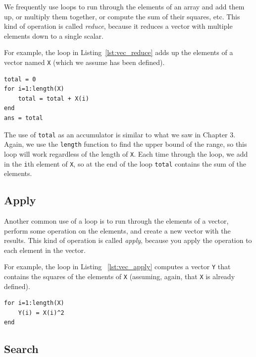 We frequently use loops to run through the elements of an array
and add them up, or multiply them together, or compute the sum
of their squares, etc.  This kind of operation is called \emph{reduce},
because it reduces a vector with multiple elements down to a single
scalar.


For example, the loop in Listing~\ref{lst:vec_reduce} adds up the elements of a vector named {\tt X}
(which we assume has been defined).

\begin{lstlisting}[caption={Reducing a vector to a single scalar value (the sum)}, label={lst:vec_reduce}]
total = 0
for i=1:length(X)
    total = total + X(i)
end
ans = total
\end{lstlisting}

The use of {\tt total} as an accumulator is similar to what we
saw in Chapter 3.  Again, we use the {\tt length} function
to find the upper bound of the range, so this loop will work
regardless of the length of {\tt X}.
Each time through the loop, we add
in the {\tt i}th element of {\tt X}, so at the end of the loop
{\tt total} contains the sum of the elements.


\subsection{Apply}
\label{apply}

Another common use of a loop is to run through the elements of
a vector, perform some operation on the elements, and create
a new vector with the results.  This kind of operation is called
\emph{apply}, because you apply the operation to each element in
the vector.


For example, the loop in Listing ~\ref{lst:vec_apply} computes a vector {\tt Y} that
contains the squares of the elements of {\tt X} (assuming, again,
that {\tt X} is already defined).

\begin{lstlisting}[caption={Making a new vector Y by squaring the elements in X }, label={lst:vec_apply}]
for i=1:length(X)
    Y(i) = X(i)^2
end
\end{lstlisting}


\subsection{Search}
\label{search}


